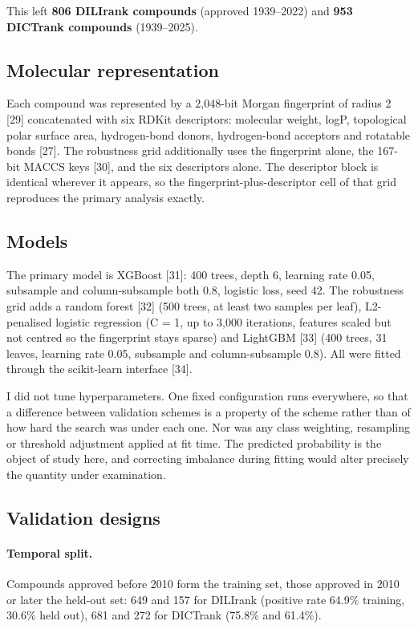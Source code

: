\documentclass[pdflatex,sn-basic,Numbered,referee,lineno]{sn-jnl}%
\theoremstyle{thmstyleone}%
\theoremstyle{thmstyletwo}%
\theoremstyle{thmstylethree}%
\begin{document}
This left \textbf{806 DILIrank compounds} (approved 1939--2022) and \textbf{953 DICTrank compounds} (1939--2025).

\subsection{Molecular representation}

Each compound was represented by a 2,048-bit Morgan fingerprint of radius 2 [29] concatenated with six RDKit descriptors: molecular weight, logP, topological polar surface area, hydrogen-bond donors, hydrogen-bond acceptors and rotatable bonds [27]. The robustness grid additionally uses the fingerprint alone, the 167-bit MACCS keys [30], and the six descriptors alone. The descriptor block is identical wherever it appears, so the fingerprint-plus-descriptor cell of that grid reproduces the primary analysis exactly.

\subsection{Models}

The primary model is XGBoost [31]: 400 trees, depth 6, learning rate 0.05, subsample and column-subsample both 0.8, logistic loss, seed 42. The robustness grid adds a random forest [32] (500 trees, at least two samples per leaf), L2-penalised logistic regression (C = 1, up to 3,000 iterations, features scaled but not centred so the fingerprint stays sparse) and LightGBM [33] (400 trees, 31 leaves, learning rate 0.05, subsample and column-subsample 0.8). All were fitted through the scikit-learn interface [34].

I did not tune hyperparameters. One fixed configuration runs everywhere, so that a difference between validation schemes is a property of the scheme rather than of how hard the search was under each one. Nor was any class weighting, resampling or threshold adjustment applied at fit time. The predicted probability is the object of study here, and correcting imbalance during fitting would alter precisely the quantity under examination.

\subsection{Validation designs}

\paragraph{Temporal split.}
Compounds approved before 2010 form the training set, those approved in 2010 or later the held-out set: 649 and 157 for DILIrank (positive rate 64.9\% training, 30.6\% held out), 681 and 272 for DICTrank (75.8\% and 61.4\%).
\end{document}
